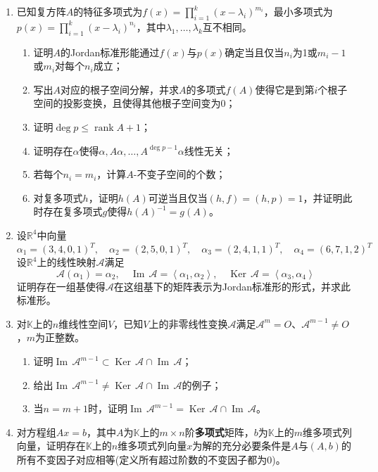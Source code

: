 \documentclass[a4paper,UTF8,fontset=windows,AutoFakeBold]{ctexart}
\DeclareMathOperator{\rank}{rank}
\DeclareMathOperator{\im}{Im\,}
\DeclareMathOperator{\Ker}{Ker\,}
\newcommand*{\ma}{\mathcal{A}}
\begin{document}
\begin{enumerate}
    \item 已知复方阵$A$的特征多项式为$f(x)=\prod_{i=1}^k(x-\lambda_i)^{m_i}$，最小多项式为$p(x)=\prod_{i=1}^k(x-\lambda_i)^{n_i}$，其中$\lambda_1,\dots,\lambda_k$互不相同。
    \begin{enumerate}
        \item 证明$A$的Jordan标准形能通过$f(x)$与$p(x)$确定当且仅当$n_i$为1或$m_i-1$或$m_i$对每个$n_i$成立；
        \item 写出$A$对应的根子空间分解，并求$A$的多项式$f(A)$使得它是到第$i$个根子空间的投影变换，且使得其他根子空间变为0；
        \item 证明$\deg p\le\rank A+1$；
        \item 证明存在$\alpha$使得$\alpha,A\alpha,\dots,A^{\deg p-1}\alpha$线性无关；
        \item 若每个$n_i=m_i$，计算$A$-不变子空间的个数；
        \item 对复多项式$h$，证明$h(A)$可逆当且仅当$(h,f)=(h,p)=1$，并证明此时存在复多项式$g$使得$h(A)^{-1}=g(A)$。
    \end{enumerate}

    \item 设$\mathbb{R}^4$中向量
    $$\alpha_1=(3,4,0,1)^T,\quad\alpha_2=(2,5,0,1)^T,\quad\alpha_3=(2,4,1,1)^T,\quad\alpha_4=(6,7,1,2)^T$$
    设$\mathbb{R}^4$上的线性映射$\ma$满足
    $$\ma(\alpha_1)=\alpha_2,\quad\im\ma=\left<\alpha_1,\alpha_2\right>,\quad\Ker\ma=\left<\alpha_3,\alpha_4\right>$$
    证明存在一组基使得$\ma$在这组基下的矩阵表示为Jordan标准形的形式，并求此标准形。
    
    \item 对$\mathbb{K}$上的$n$维线性空间$V$，已知$V$上的非零线性变换$\ma$满足$\ma^m=O$、$\ma^{m-1}\ne O$，$m$为正整数。
    \begin{enumerate}
        \item 证明$\im\ma^{m-1}\subset\Ker\ma\cap\im\ma$；
        \item 给出$\im\ma^{m-1}\ne\Ker\ma\cap\im\ma$的例子；
        \item 当$n=m+1$时，证明$\im\ma^{m-1}=\Ker\ma\cap\im\ma$。
    \end{enumerate}

    \item 对方程组$Ax=b$，其中$A$为$\mathbb{K}$上的$m\times n$阶\textbf{多项式}矩阵，$b$为$\mathbb{K}$上的$m$维多项式列向量，证明存在$\mathbb{K}$上的$n$维多项式列向量$x$为解的充分必要条件是$A$与$(A,b)$的所有不变因子对应相等(定义所有超过阶数的不变因子都为0)。    
\end{enumerate}
\end{document}
